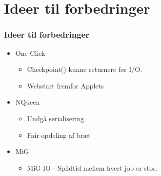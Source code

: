 \documentclass{beamer}
\begin{document}
	

\section{Ideer til forbedringer}
\frame
{
  \frametitle{Ideer til forbedringer}

  \begin{itemize}
		\item<+-> One-Click
		\begin{itemize}
			\item<+-> Checkpoint() kunne returnere før I/O.
			\item<+-> Webstart fremfor Applets
		\end{itemize}
		\item<+-> NQueen 
		\begin{itemize}
			\item<+-> Undgå serialisering
			\item<+-> Fair opdeling af bræt
		\end{itemize}
				\item<+-> MiG
		\begin{itemize}
			\item<+-> MiG IO - Spildtid mellem hvert job er stor.
		\end{itemize}

  \end{itemize}
}
\end{document}
